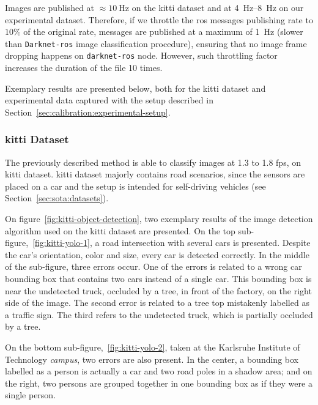 Images are published at $\approx\SI{10}{\hertz}$ on the \ac{kitti} dataset and at \SIrange[range-units=single]{4}{8}{\hertz} on our experimental dataset. Therefore, if we throttle the \ac{ros} messages publishing rate to $10\%$ of the original rate, messages are published at a maximum of \SI{1}{\hertz} (slower than \texttt{Darknet-ros} image classification procedure), ensuring that no image frame dropping happens on \texttt{darknet-ros} node. However, such throttling factor increases the duration of the file 10 times.

Exemplary results are presented below, both for the \ac{kitti} dataset and experimental data captured with the setup described in Section~\ref{sec:calibration:experimental-setup}.
	
\subsubsection{\ac{kitti} Dataset}
The previously described method is able to classify images at 1.3 to 1.8 \ac{fps}, on \ac{kitti} dataset. \ac{kitti} dataset majorly contains road scenarios, since the sensors are placed on a car and the setup is intended for self-driving vehicles (see Section~\ref{sec:sota:datasets}).

On figure~\ref{fig:kitti-object-detection}, two exemplary results of the image detection algorithm used on the \ac{kitti} dataset are presented. On the top sub-figure,~\ref{fig:kitti-yolo-1}, a road intersection with several cars is presented. Despite the car's orientation, color and size, every car is detected correctly. In the middle of the sub-figure, three errors occur. One of the errors is related to a wrong car bounding box that contains two cars instead of a single car. This bounding box is near the undetected truck, occluded by a tree, in front of the factory, on the right side of the image. The second error is related to a tree top mistakenly labelled as a traffic sign. The third refers to the undetected truck, which is partially occluded by a tree.

On the bottom sub-figure,~\ref{fig:kitti-yolo-2}, taken at the Karlsruhe Institute of Technology \textit{campus}, two errors are also present. In the center, a bounding box labelled as a person is actually a car and two road poles in a shadow area; and on the right, two persons are grouped together in one bounding box as if they were a single person.
	
